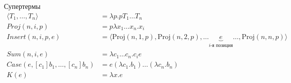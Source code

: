 \documentclass{beamer}
\begin{document}
\begin{frame}{Супертермы}
  \scriptsize
  \begin{align*}
    \langle T_1, \ldots, T_n \rangle & = \lambda p. p T_1 \ldots T_n \\
    Proj(n, i, p) & = p \lambda x_1 \ldots x_n . x_i\\
    Insert(n, i, p, e) & = \langle \mathrm{Proj}(n, 1, p),\mathrm{Proj}(n, 2, p),\ldots \underbrace{e}_{i\text{-я позиция}}\ldots,\mathrm{Proj}(n, n, p) \rangle \\
    Sum(n, i, e) &= \lambda c_1 \ldots c_n . c_i e \\
    Case(e, [c_1]b_1, \ldots, [c_n]b_n) &= e(\lambda c_1.b_1)\ldots(\lambda c_n.b_n) \\
    K(e) &= \lambda x.e
  \end{align*}

\end{frame}
\end{document}
